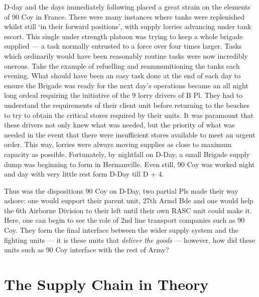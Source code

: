 \documentclass[noraggedright]{turabian-researchpaper}
\begin{document}
D-day and the days immediately following placed a great strain on the
elements of 90 Coy in France.  There were many instances where tanks 
were replenished whilst still `in their forward positions', 
with supply lorries advancing under tank escort.\autocites[6 June 1944]
{90wdjun}[3]{90wdjun} 
This single under strength platoon was trying to keep a whole brigade supplied
--- a task normally entrusted to a force over four times larger.
Tasks which ordinarily would have been reasonably routine tasks were now 
incredibly onerous.  Take the example of refuelling and reammunitioning the 
tanks each evening.  What should have been an easy task done at the end of 
each day to ensure the Brigade was ready for the next day's operations became 
an all night long ordeal requiring the initiative of the 9 lorry drivers of B 
Pl.  They had to understand the requirements of their client unit before 
returning to the beaches to try to obtain the critical stores required by 
their units.  It was paramount that these drivers not only knew what was 
needed, but the priority of what was needed in the event that there were 
insufficient stores available to meet an urgent order.  This way, lorries 
were always moving supplies as close to maximum capacity as possible.  
Fortunately, by nightfall 
on D-Day, a small Brigade supply dump was beginning to form in Hermanville.  
Even still, 90 Coy was worked night and day with very little rest form D-Day
till D + 4.\autocite[2]{90wdjun} 


Thus was the dispositions 90 Coy on D-Day, two partial Pls made their way 
ashore: one would support their parent unit, 27th Armd Bde and one would help 
the 6th Airborne Division to their left until their own RASC unit could make 
it. Here, one can begin to see the role of 2nd line transport companies such 
as 90 Coy.  They form the final interface between the wider supply system and 
the fighting units ---  it is these units that \textit{deliver the goods} --- 
however, how did these units such as 90 Coy interface with the rest of Army?  

\section{The Supply Chain in Theory} 
\end{document}
